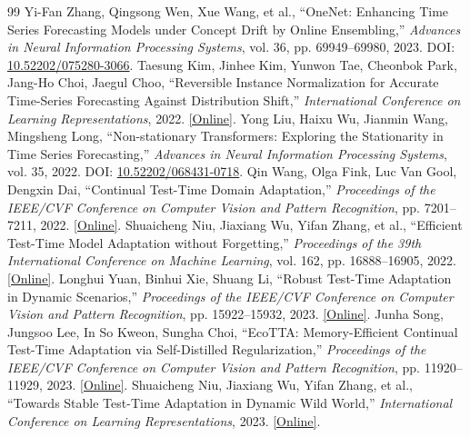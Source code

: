 \begin{thebibliography}{99}
 Yi-Fan Zhang, Qingsong Wen, Xue Wang, et al., ``OneNet: Enhancing Time Series Forecasting Models under Concept Drift by Online Ensembling,'' \emph{Advances in Neural Information Processing Systems}, vol. 36, pp. 69949--69980, 2023. DOI: \href{https://doi.org/10.52202/075280-3066}{10.52202/075280-3066}.
 Taesung Kim, Jinhee Kim, Yunwon Tae, Cheonbok Park, Jang-Ho Choi, Jaegul Choo, ``Reversible Instance Normalization for Accurate Time-Series Forecasting Against Distribution Shift,'' \emph{International Conference on Learning Representations}, 2022. \href{https://mlanthology.org/iclr/2022/kim2022iclr-reversible/}{[Online]}.
 Yong Liu, Haixu Wu, Jianmin Wang, Mingsheng Long, ``Non-stationary Transformers: Exploring the Stationarity in Time Series Forecasting,'' \emph{Advances in Neural Information Processing Systems}, vol. 35, 2022. DOI: \href{https://doi.org/10.52202/068431-0718}{10.52202/068431-0718}.
 Qin Wang, Olga Fink, Luc Van Gool, Dengxin Dai, ``Continual Test-Time Domain Adaptation,'' \emph{Proceedings of the IEEE/CVF Conference on Computer Vision and Pattern Recognition}, pp. 7201--7211, 2022. \href{https://openaccess.thecvf.com/content/CVPR2022/html/Wang_Continual_Test-Time_Domain_Adaptation_CVPR_2022_paper.html}{[Online]}.
 Shuaicheng Niu, Jiaxiang Wu, Yifan Zhang, et al., ``Efficient Test-Time Model Adaptation without Forgetting,'' \emph{Proceedings of the 39th International Conference on Machine Learning}, vol. 162, pp. 16888--16905, 2022. \href{https://proceedings.mlr.press/v162/niu22a.html}{[Online]}.
 Longhui Yuan, Binhui Xie, Shuang Li, ``Robust Test-Time Adaptation in Dynamic Scenarios,'' \emph{Proceedings of the IEEE/CVF Conference on Computer Vision and Pattern Recognition}, pp. 15922--15932, 2023. \href{https://openaccess.thecvf.com/content/CVPR2023/html/Yuan_Robust_Test-Time_Adaptation_in_Dynamic_Scenarios_CVPR_2023_paper.html}{[Online]}.
 Junha Song, Jungsoo Lee, In So Kweon, Sungha Choi, ``EcoTTA: Memory-Efficient Continual Test-Time Adaptation via Self-Distilled Regularization,'' \emph{Proceedings of the IEEE/CVF Conference on Computer Vision and Pattern Recognition}, pp. 11920--11929, 2023. \href{https://openaccess.thecvf.com/content/CVPR2023/html/Song_EcoTTA_Memory-Efficient_Continual_Test-Time_Adaptation_via_Self-Distilled_Regularization_CVPR_2023_paper.html}{[Online]}.
 Shuaicheng Niu, Jiaxiang Wu, Yifan Zhang, et al., ``Towards Stable Test-Time Adaptation in Dynamic Wild World,'' \emph{International Conference on Learning Representations}, 2023. \href{https://mlanthology.org/iclr/2023/niu2023iclr-stable/}{[Online]}.

\end{thebibliography}
